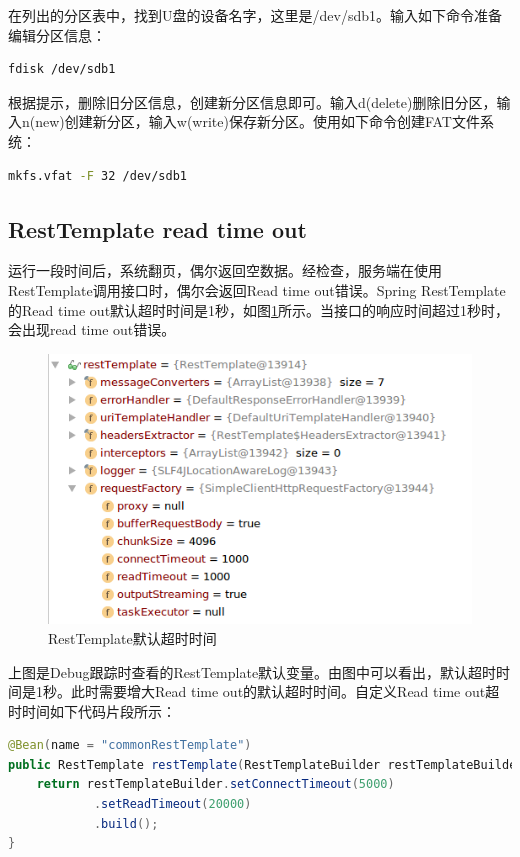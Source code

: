 \documentclass{book}
\begin{document}
在列出的分区表中，找到U盘的设备名字，这里是/dev/sdb1。输入如下命令准备编辑分区信息：

\begin{lstlisting}[language=Bash]
fdisk /dev/sdb1
\end{lstlisting}

根据提示，删除旧分区信息，创建新分区信息即可。输入d(delete)删除旧分区，输入n(new)创建新分区，输入w(write)保存新分区。使用如下命令创建FAT文件系统：

\begin{lstlisting}[language=Bash]
mkfs.vfat -F 32 /dev/sdb1
\end{lstlisting}

\subsection{RestTemplate read time out}

运行一段时间后，系统翻页，偶尔返回空数据。经检查，服务端在使用RestTemplate调用接口时，偶尔会返回Read time out错误。Spring RestTemplate的Read time out默认超时时间是1秒，如图\ref{fig:resttempldatedefaulttimeout}所示。当接口的响应时间超过1秒时，会出现read time out错误。

\begin{figure}[htbp]
	\centering
	\includegraphics[scale=0.6]{resttempldatedefaulttimeout.png}
	\caption{RestTemplate默认超时时间}
	\label{fig:resttempldatedefaulttimeout}
\end{figure}

上图是Debug跟踪时查看的RestTemplate默认变量。由图中可以看出，默认超时时间是1秒。此时需要增大Read time out的默认超时时间。自定义Read time out超时时间如下代码片段所示：

\begin{lstlisting}[language=Java]
@Bean(name = "commonRestTemplate")
public RestTemplate restTemplate(RestTemplateBuilder restTemplateBuilder) {
	return restTemplateBuilder.setConnectTimeout(5000)
			.setReadTimeout(20000)
			.build();
}
\end{lstlisting}
\end{document}
